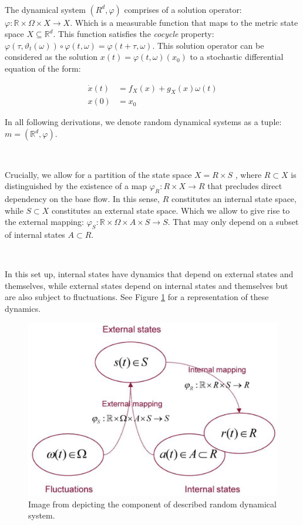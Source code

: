 \documentclass{article}
\newcommand{\R}{\mathbb{R}}
\begin{document}
\

The dynamical system $(R^d, \varphi)$ comprises of a solution operator: $\varphi: \R \times \Omega \times X \to X$. Which is a measurable function that maps to the metric state space $X \subseteq \mathbb{R}^d$. This function satisfies the \textit{cocycle} property: $\varphi(\tau, \vartheta_t(\omega)) \circ \varphi(t, \omega) = \varphi(t + \tau, \omega)$. This solution operator can be considered as the solution $x(t) = \varphi(t, \omega)(x_0)$ to a stochastic differential equation of the form:

\begin{equation}
	\begin{aligned}
		\dot{x}(t) &= f_X(x) + g_X(x)\omega(t) \\
		x(0) &= x_0
	\end{aligned}
\end{equation}

In all following derivations, we denote random dynamical systems as a tuple: $m = (\R^d, \varphi)$.

\

Crucially, we allow for a partition of the state space $X = R \times S$ , where $R \subset X$ is distinguished by  the existence of a map $\varphi_R : R \times X \to R$ that precludes direct dependency on the base flow. In this  sense, $R$ constitutes an internal state space, while $S \subset X$ constitutes an external state space. Which we allow to give rise to the external mapping: $\varphi_S: \R \times \Omega \times A \times S \to S$. That may only depend on a subset of internal states $A \subset R$. 

\

In this set up, internal states have dynamics that depend on external states and themselves, while external states depend on internal states and themselves but are also subject to fluctuations. See Figure \ref{fig:random_dynamical_system} for a representation of these dynamics.

\begin{figure}[htbp]
    \centering
    \includegraphics[scale=0.5]{images/random_dynamical_system.png}
    \caption{Image from \citet{friston2012free} depicting the component of described random dynamical system.}
    \label{fig:random_dynamical_system}
\end{figure}
\end{document}
